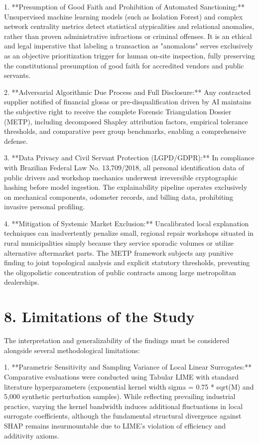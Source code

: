 \documentclass[10pt,a4paper,journal]{article}
\begin{document}
1. **Presumption of Good Faith and Prohibition of Automated Sanctioning:** Unsupervised machine learning models (such as Isolation Forest) and complex network centrality metrics detect statistical atypicalities and relational anomalies, rather than proven administrative infractions or criminal offenses. It is an ethical and legal imperative that labeling a transaction as "anomalous" serves exclusively as an objective prioritization trigger for human on-site inspection, fully preserving the constitutional presumption of good faith for accredited vendors and public servants.

2. **Adversarial Algorithmic Due Process and Full Disclosure:** Any contracted supplier notified of financial glosas or pre-disqualification driven by AI maintains the subjective right to receive the complete Forensic Triangulation Dossier (METP), including decomposed Shapley attribution factors, empirical tolerance thresholds, and comparative peer group benchmarks, enabling a comprehensive defense.

3. **Data Privacy and Civil Servant Protection (LGPD/GDPR):** In compliance with Brazilian Federal Law No. 13,709/2018, all personal identification data of public drivers and workshop mechanics underwent irreversible cryptographic hashing before model ingestion. The explainability pipeline operates exclusively on mechanical components, odometer records, and billing data, prohibiting invasive personal profiling.

4. **Mitigation of Systemic Market Exclusion:** Uncalibrated local explanation techniques can inadvertently penalize small, regional repair workshops situated in rural municipalities simply because they service sporadic volumes or utilize alternative aftermarket parts. The METP framework subjects any punitive finding to joint topological analysis and explicit statutory thresholds, preventing the oligopolistic concentration of public contracts among large metropolitan dealerships.

\section{8. Limitations of the Study}
The interpretation and generalizability of the findings must be considered alongside several methodological limitations:

1. **Parametric Sensitivity and Sampling Variance of Local Linear Surrogates:** Comparative evaluations were conducted using Tabular LIME with standard literature hyperparameters (exponential kernel width sigma = 0.75 * sqrt(M) and 5,000 synthetic perturbation samples). While reflecting prevailing industrial practice, varying the kernel bandwidth induces additional fluctuations in local surrogate coefficients, although the fundamental structural divergence against SHAP remains insurmountable due to LIME's violation of efficiency and additivity axioms.
\end{document}

